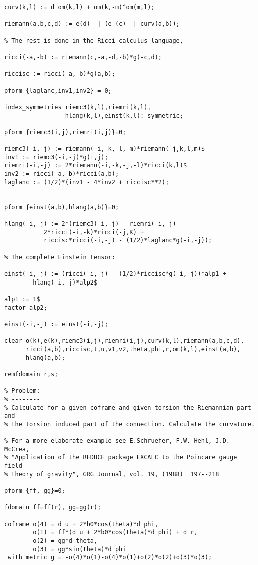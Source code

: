 {\begin{verbatim}
curv(k,l) := d om(k,l) + om(k,-m)^om(m,l);

riemann(a,b,c,d) := e(d) _| (e (c) _| curv(a,b));

% The rest is done in the Ricci calculus language,

ricci(-a,-b) := riemann(c,-a,-d,-b)*g(-c,d);

riccisc := ricci(-a,-b)*g(a,b);

pform {laglanc,inv1,inv2} = 0;

index_symmetries riemc3(k,l),riemri(k,l),
                 hlang(k,l),einst(k,l): symmetric;

pform {riemc3(i,j),riemri(i,j)}=0;

riemc3(-i,-j) := riemann(-i,-k,-l,-m)*riemann(-j,k,l,m)$
inv1 := riemc3(-i,-j)*g(i,j);
riemri(-i,-j) := 2*riemann(-i,-k,-j,-l)*ricci(k,l)$
inv2 := ricci(-a,-b)*ricci(a,b);
laglanc := (1/2)*(inv1 - 4*inv2 + riccisc**2);


pform {einst(a,b),hlang(a,b)}=0;

hlang(-i,-j) := 2*(riemc3(-i,-j) - riemri(-i,-j) -
		   2*ricci(-i,-k)*ricci(-j,K) +
		   riccisc*ricci(-i,-j) - (1/2)*laglanc*g(-i,-j));

% The complete Einstein tensor: 

einst(-i,-j) := (ricci(-i,-j) - (1/2)*riccisc*g(-i,-j))*alp1 +
		hlang(-i,-j)*alp2$

alp1 := 1$
factor alp2;

einst(-i,-j) := einst(-i,-j);

clear o(k),e(k),riemc3(i,j),riemri(i,j),curv(k,l),riemann(a,b,c,d),
      ricci(a,b),riccisc,t,u,v1,v2,theta,phi,r,om(k,l),einst(a,b),
      hlang(a,b);

remfdomain r,s; 

% Problem:
% --------
% Calculate for a given coframe and given torsion the Riemannian part and
% the torsion induced part of the connection. Calculate the curvature.

% For a more elaborate example see E.Schruefer, F.W. Hehl, J.D. McCrea,
% "Application of the REDUCE package EXCALC to the Poincare gauge field
% theory of gravity", GRG Journal, vol. 19, (1988)  197--218

pform {ff, gg}=0;

fdomain ff=ff(r), gg=gg(r);

coframe o(4) = d u + 2*b0*cos(theta)*d phi,
        o(1) = ff*(d u + 2*b0*cos(theta)*d phi) + d r,
        o(2) = gg*d theta,
        o(3) = gg*sin(theta)*d phi
 with metric g = -o(4)*o(1)-o(4)*o(1)+o(2)*o(2)+o(3)*o(3);


\end{verbatim}}
